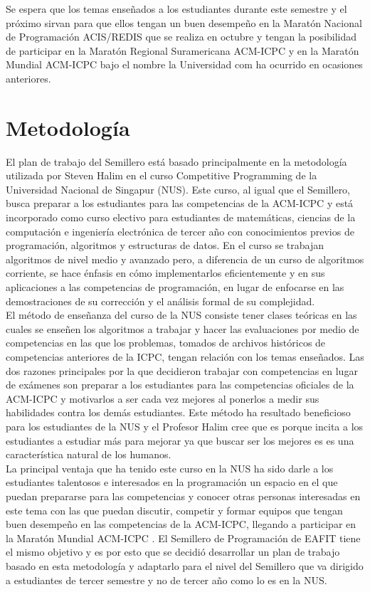 \documentclass[conference]{IEEEtran}
\begin{document}
Se espera que los temas enseñados a los estudiantes durante este semestre y el próximo sirvan para que ellos tengan un buen desempeño en la Maratón Nacional de Programación ACIS/REDIS que se realiza en octubre y tengan la posibilidad de participar en la Maratón Regional Suramericana ACM-ICPC y en la Maratón Mundial ACM-ICPC bajo el nombre la Universidad com ha ocurrido en ocasiones anteriores.

\section{Metodología}
El plan de trabajo del Semillero está basado principalmente en la metodología utilizada por Steven Halim en el curso Competitive Programming de la Universidad Nacional de Singapur (NUS). Este curso, al igual que el Semillero, busca preparar a los estudiantes para las competencias de la ACM-ICPC y está incorporado como curso electivo para estudiantes de matemáticas, ciencias de la computación e ingeniería electrónica de tercer año con conocimientos previos de programación, algoritmos y estructuras de datos. En el curso se trabajan algoritmos de nivel medio y avanzado pero, a diferencia de un curso de algoritmos corriente, se hace énfasis en cómo implementarlos eficientemente y en sus aplicaciones a las competencias de programación, en lugar de enfocarse en las demostraciones de su corrección y el análisis formal de su complejidad\cite{PaperHalim}.\\
El método de enseñanza del curso de la NUS consiste tener clases teóricas en las cuales se enseñen los algoritmos a trabajar y hacer las evaluaciones por medio de competencias en las que los problemas, tomados de archivos históricos de competencias anteriores de la ICPC, tengan relación con los temas enseñados. Las dos razones principales por la que decidieron trabajar con competencias en lugar de exámenes son preparar a los estudiantes para las competencias oficiales de la ACM-ICPC y motivarlos a ser cada vez mejores al ponerlos a medir sus habilidades contra los demás estudiantes. Este método ha resultado beneficioso para los estudiantes de la NUS y el Profesor Halim cree que es porque incita a los estudiantes a estudiar más para mejorar ya que buscar ser los mejores es es una característica natural de los humanos.\\
La principal ventaja que ha tenido este curso en la NUS ha sido darle a los estudiantes talentosos e interesados en la programación un espacio en el que puedan prepararse para las competencias y conocer otras personas interesadas en este tema con las que puedan discutir, competir y formar equipos que tengan buen desempeño en las competencias de la ACM-ICPC, llegando a participar en la Maratón Mundial ACM-ICPC \cite{AlgoNUS}. El Semillero de Programación de EAFIT tiene el mismo objetivo y es por esto que se decidió desarrollar un plan de trabajo basado en esta metodología y adaptarlo para el nivel del Semillero que va dirigido a estudiantes de tercer semestre y no de tercer año como lo es en la NUS.
\end{document}
